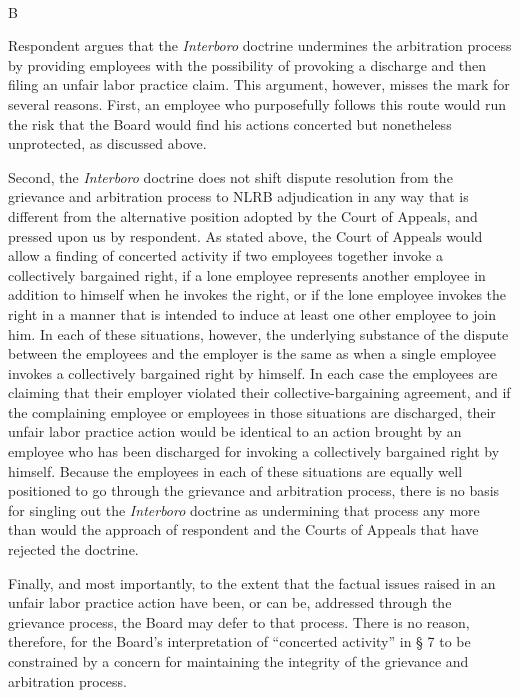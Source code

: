 \documentclass[
  letterpaper,
  11pt,
  DIV=9,
  openright]{scrbook}
\makeatletter
\let\oldparagraph\paragraph
\renewcommand{\paragraph}{
    \@ifstar
      \xxxParagraphStar
      \xxxParagraphNoStar
  }
\newcommand{\xxxParagraphStar}[1]{\oldparagraph*{#1}\mbox{}}
\newcommand{\xxxParagraphNoStar}[1]{\oldparagraph{#1}\mbox{}}
\makeatother
\begin{document}
\paragraph{B}\label{b}

Respondent argues that the \emph{Interboro} doctrine undermines the
arbitration process by providing employees with the possibility of
provoking a discharge and then filing an unfair labor practice claim.
This argument, however, misses the mark for several reasons. First, an
employee who purposefully follows this route would run the risk that the
Board would find his actions concerted but nonetheless unprotected, as
discussed above.

Second, the \emph{Interboro} doctrine does not shift dispute resolution
from the grievance and arbitration process to NLRB adjudication in any
way that is different from the alternative position adopted by the Court
of Appeals, and pressed upon us by respondent. As stated above, the
Court of Appeals would allow a finding of concerted activity if two
employees together invoke a collectively bargained right, if a lone
employee represents another employee in addition to himself when he
invokes the right, or if the lone employee invokes the right in a manner
that is intended to induce at least one other employee to join him. In
each of these situations, however, the underlying substance of the
dispute between the employees and the employer is the same as when a
single employee invokes a collectively bargained right by himself. In
each case the employees are claiming that their employer violated their
collective-bargaining agreement, and if the complaining employee or
employees in those situations are discharged, their unfair labor
practice action would be identical to an action brought by an employee
who has been discharged for invoking a collectively bargained right by
himself. Because the employees in each of these situations are equally
well positioned to go through the grievance and arbitration process,
there is no basis for singling out the \emph{Interboro} doctrine as
undermining that process any more than would the approach of respondent
and the Courts of Appeals that have rejected the doctrine.

Finally, and most importantly, to the extent that the factual issues
raised in an unfair labor practice action have been, or can be,
addressed through the grievance process, the Board may defer to that
process. There is no reason, therefore, for the Board's interpretation
of ``concerted activity'' in § 7 to be constrained by a concern for
maintaining the integrity of the grievance and arbitration process.
\end{document}
